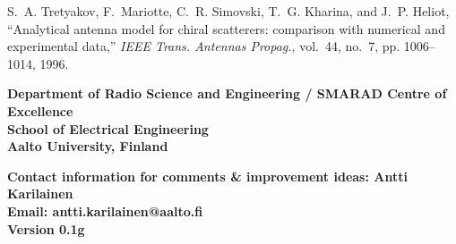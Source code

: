 \documentclass[portrait,a1,final]{a0poster} %
\begin{document}
\begin{minipage}{0.98\linewidth}
\begin{minipage}[t]{0.47\linewidth}
{\footnotesize %

\begin{thebibliography}{1}


S.~A. Tretyakov, F.~Mariotte, C.~R. Simovski, T.~G. Kharina, and J.~P. Heliot,
  ``Analytical antenna model for chiral scatterers: comparison with numerical
  and experimental data,'' \emph{{IEEE} Trans. Antennas Propag.}, vol.~44,
  no.~7, pp. 1006--1014, 1996.
  
  

\end{thebibliography}

} %



\end{minipage}
\end{minipage} %





\vfill %


\begin{minipage}{0.95\linewidth} %


\footnotesize %


\begin{minipage}[t]{0.47\linewidth}%
\vspace{0pt}

\textsf{\textbf{Department of Radio Science and Engineering / SMARAD Centre of Excellence\\
School of Electrical Engineering\\
Aalto University, Finland}}

\end{minipage} %
\hspace{0.03\linewidth}
\begin{minipage}[t]{0.47\linewidth} %
\vspace{0pt}

\textsf{\textbf{Contact information for comments \& improvement ideas: Antti Karilainen\\
Email: antti.karilainen@aalto.fi\\
Version 0.1g}}
\end{minipage}



\end{minipage}




\vspace*{0.03\linewidth} %
\end{document}
